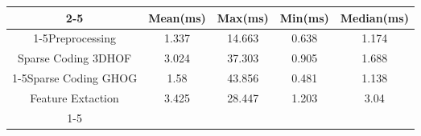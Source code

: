 \documentclass{standalone}
\begin{document}
 
 \begin{tabular}{|c |c |c |c |c |}
\cline{2-5}\cline{2-5} \multicolumn{1}{c |}{ } & Mean(ms) & Max(ms) & Min(ms) & Median(ms)\\ 
\cline{1-5}Preprocessing & 1.337 & 14.663 & 0.638 & 1.174\\ 
 \hhline{|=|=|=|=|=|}Sparse Coding 3DHOF & 3.024 & 37.303 & 0.905 & 1.688\\ 
 \cline{1-5}Sparse Coding GHOG & 1.58 & 43.856 & 0.481 & 1.138\\ 
 \hhline{|=|=|=|=|=|}Feature Extaction & 3.425 & 28.447 & 1.203 & 3.04\\ 
 \cline{1-5}\hline \end{tabular}
 
\end{document}
